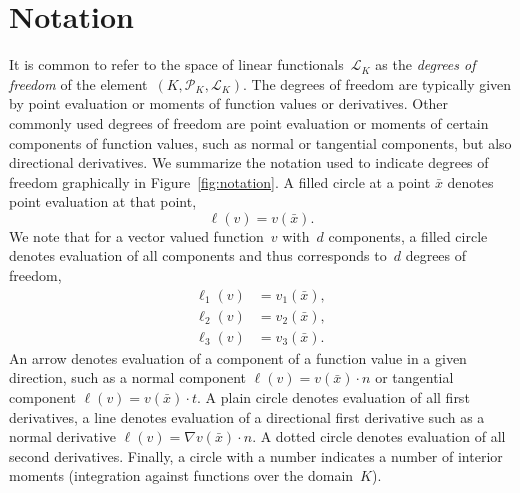 \section{Notation}

It is common to refer to the space of linear
functionals~$\mathcal{L}_K$ as the \emph{degrees of freedom} of the
element~$(K, \mathcal{P}_K, \mathcal{L}_K)$. The degrees of freedom
are typically given by point evaluation or moments of function values
or derivatives. Other commonly used degrees of freedom are point
evaluation or moments of certain components of function values, such
as normal or tangential components, but also directional derivatives.
We summarize the notation used to indicate degrees of freedom
graphically in Figure~\ref{fig:notation}. A filled circle at a point
$\bar{x}$ denotes point evaluation at that point,
\begin{displaymath}
  \ell(v) = v(\bar{x}).
\end{displaymath}
We note that for a vector valued function~$v$ with~$d$ components, a
filled circle denotes evaluation of all components and thus
corresponds to~$d$ degrees of freedom,
\begin{displaymath}
  \begin{split}
    \ell_1(v) &= v_1(\bar{x}), \\
    \ell_2(v) &= v_2(\bar{x}), \\
    \ell_3(v) &= v_3(\bar{x}).
  \end{split}
\end{displaymath}
An arrow denotes evaluation of a component of a function value in a
given direction, such as a normal component $\ell(v) = v(\bar{x})
\cdot n$ or tangential component $\ell(v) = v(\bar{x})
\cdot t$. A plain circle denotes evaluation of all first derivatives,
a line denotes evaluation of a directional first derivative such as a
normal derivative $\ell(v) = \nabla v(\bar{x}) \cdot n$.  A dotted
circle denotes evaluation of all second derivatives. Finally, a circle
with a number indicates a number of interior moments (integration
against functions over the domain~$K$).


